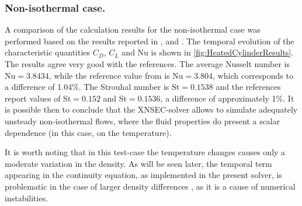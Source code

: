 \subsubsection{Non-isothermal case.}
A comparison of the calculation results for the non-isothermal case was performed based on the results reported in \textcite{shiHeatingEffectSteady2004}, \textcite{wangRelationshipEffectiveReynolds2000} and \textcite{henninkLowMachNumberFlow2022}.
The temporal evolution of the characteristic quantities $C_D$, $C_L$ and Nu is shown in \cref{fig:HeatedCylinderResults}. The results agree very good with the references. The average Nusselt number is  $\text{Nu} = 3.8434$, while the reference value from \textcite{henninkLowMachNumberFlow2022} is $\text{Nu} = 3.804$, which corresponds to a difference of 1.04\%. The Strouhal number is $\text{St} = 0.1538$ and the references report values of $\text{St} = 0.152$ and $\text{St} = 0.1536$, a difference of approximately 1\%. It is possible then to conclude that the XNSEC-solver allows to simulate adequately unsteady non-isothermal flows, where the fluid properties do present a scalar dependence (in this case, on the temperature). 

It is worth noting that in this test-case the temperature changes causes only a moderate variation in the density. As will be seen later, the temporal term appearing in the continuity equation, as implemented in the present solver, is problematic in the case of larger density differences \parencite{knikkerComparativeStudyHighorder2011}, as it is a cause of numerical instabilities.




\FloatBarrier